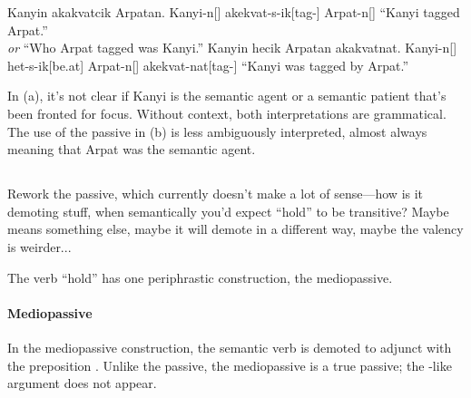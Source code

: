 \begin{gloss*}
	\a \begingl
		\glpreamble Kanyin akakvatcik Arpatan. \endpreamble
			Kanyi-n[]
			akekvat-s-ik[tag-]
			Arpat-n[]
		\glft “Kanyi tagged Arpat.” \\ \textit{or} “Who Arpat tagged was Kanyi.”
	\endgl
	\a \begingl
		\glpreamble Kanyin hecik Arpatan akakvatnat. \endpreamble
			Kanyi-n[]
			het-s-ik[be.at]
			Arpat-n[]
			akekvat-nat[tag-]
		\glft “Kanyi was tagged by Arpat.”
	\endgl
\end{gloss*}

In (\lastx a), it's not clear if Kanyi is the semantic agent or a semantic patient that's been fronted for focus. Without context, both interpretations are grammatical. The use of the passive in (\lastx b) is less ambiguously interpreted, almost always meaning that Arpat was the semantic agent.

\subsection{}
\begin{kaobox}[frametitle=\sc todo:]
    Rework the  passive, which currently doesn't make a lot of sense---how is it demoting stuff, when semantically you'd expect “hold” to be transitive? Maybe  means something else, maybe it will demote in a different way, maybe the valency is weirder...
\end{kaobox}

The verb  “hold” has one periphrastic construction, the mediopassive. 

\paragraph{Mediopassive}
In the mediopassive construction, the semantic verb is demoted to adjunct with the preposition . Unlike the  passive, the  mediopassive is a true passive; the -like argument does not appear.
